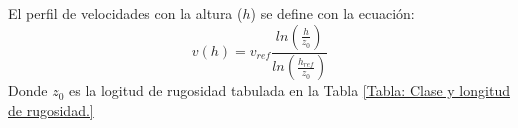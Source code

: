 \documentclass[12pt]{report}
\begin{document}





El perfil de velocidades con la altura ($h$) se define con la ecuación:
\begin{equation}
    v(h) = v_{ref} \frac{ln \left( \frac{h}{z_0} \right)}{ln \left( \frac{h_{ref}}{z_0} \right)}
\end{equation}
Donde $z_0$ es la logitud de rugosidad tabulada en la Tabla \ref{Tabla: Clase y longitud de rugosidad.}
\end{document}
